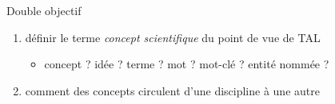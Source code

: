\begin{frame}{Double objectif}
\begin{enumerate}
	\item définir le terme \textit{concept scientifique} du point de vue de \textsc{TAL}
	\begin{itemize}
		\item concept ? idée ? terme ? mot ? mot-clé ? entité nommée ?
	\end{itemize}
	\item comment des concepts circulent d’une discipline à une autre
	\begin{flushright}
		\small
		\citep[p.~331]{landais2014frederic}
	\end{flushright} 
\end{enumerate}


\end{frame}